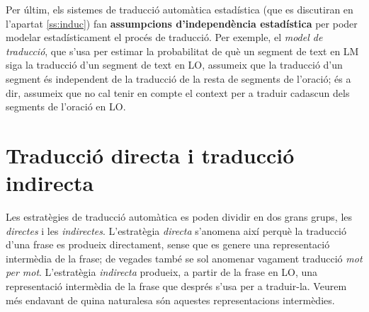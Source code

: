 
Per últim, els sistemes de traducció automàtica estadística (que es
discutiran en l'apartat \ref{ss:induc}) fan \textbf{assumpcions
  d'independència estadística} per poder modelar estadísticament el
procés de traducció. Per exemple, el \emph{model de traducció}, que
s'usa per estimar la probabilitat de què un segment de text en LM siga
la traducció d'un segment de text en LO, assumeix que la traducció
d'un segment és independent de la traducció de la resta de segments de
l'oració; és a dir, assumeix que no cal tenir en compte el context per
a traduir cadascun dels segments de l'oració en LO.

\section{Traducció directa i traducció indirecta}
\label{ss:dirindir} 
Les estratègies de traducció automàtica es poden dividir en dos grans
grups, les \emph{directes} i les \emph{indirectes}. L'estratègia
\emph{directa} s'anomena així perquè la traducció d'una frase es
produeix directament, sense que es genere una representació intermèdia
de la frase; de vegades també se sol anomenar vagament traducció
\emph{mot per mot}. L'estratègia \emph{indirecta} produeix, a partir
de la frase en LO, una representació intermèdia de la frase que
després s'usa per a traduir-la. Veurem més endavant de quina
naturalesa són aquestes representacions intermèdies.

